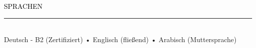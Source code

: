 {\setmainfont{Rubik Medium}\fontsize{11}{14}\selectfont\textcolor{black}{SPRACHEN}}
\\[-4pt]
\textcolor{black}{\rule{\textwidth}{2pt}}\\

Deutsch - B2 (Zertifiziert) • Englisch (fließend) • Arabisch (Muttersprache)

\vspace{0.7em}



